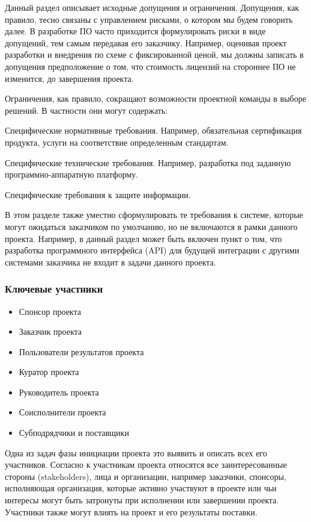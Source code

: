 \documentclass{../industrial-development}
\begin{document}
Данный раздел описывает исходные допущения и ограничения. Допущения, как правило, тесно связаны с управлением рисками, о котором мы будем говорить далее. В разработке ПО часто приходится формулировать риски в виде допущений, тем самым передавая его заказчику. Например, оценивая проект разработки и внедрения по схеме с фиксированной ценой, мы должны записать в допущения предположение о том, что стоимость лицензий на стороннее ПО не изменится, до завершения проекта.

Ограничения, как правило, сокращают возможности проектной команды в выборе решений. В частности они могут содержать:

Специфические нормативные требования. Например, обязательная сертификация продукта, услуги на соответствие определенным стандартам.

Специфические технические требования. Например, разработка под заданную программно-аппаратную платформу.

Специфические требования к защите информации.

В этом разделе также уместно сформулировать те требования к системе, которые могут ожидаться заказчиком по умолчанию, но не включаются в рамки данного проекта. Например, в данный раздел может быть включен пункт о том, что разработка программного интерфейса (API) для будущей интеграции с другими системами заказчика не входит в задачи данного проекта.

    \begin{frame} \frametitle{Ключевые участники}
	\begin{itemize}
		\item Спонсор проекта 
		\item Заказчик проекта
		\item Пользователи результатов проекта
		\item Куратор проекта
		\item Руководитель проекта
		\item Соисполнители проекта
		\item Субподрядчики и поставщики
	\end{itemize}
    \end{frame}
    \lecturenotes

Одна из задач фазы инициации проекта это выявить и описать всех его участников. Согласно к участникам проекта относятся все заинтересованные стороны (stakeholders), лица и организации, например заказчики, спонсоры, исполняющая организация, которые активно участвуют в проекте или чьи интересы могут быть затронуты при исполнении или завершении проекта. Участники также могут влиять на проект и его результаты поставки.
\end{document}
